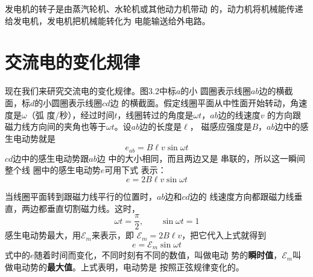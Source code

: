 发电机的转子是由蒸汽轮机、水轮机或其他动力机带动
的，动力机将机械能传递给发电机，发电机把机械能转化为
电能输送给外电路。

\section{交流电的变化规律}

\begin{figure}[htp]\centering
    \caption{}
    \end{figure}

现在我们来研究交流电的变化规律。图3.2中标$a$的小
圆圈表示线圈$ab$边的横截面，标$d$的小圆圈表示线圈$cd$边
的横截面。假定线圈平面从中性面开始转动，角速度是$\omega$（弧
度/秒），经过时间$t$，线圈转过的角度是$\omega t$，$ab$边的线速度$v$
的方向跟磁力线方向间的夹角也等于$\omega t$。设$ab$边的长度是$\ell$，
磁感应强度是$B$，$ab$边中的感
生电动势就是
\[e_{ab}=B\ell v\sin \omega t\]
$cd$边中的感生电动势跟$ab$边
中的大小相同，而且两边又是
串联的，所以这一瞬间整个线
圈中的感生电动势$e$可用下式
表示：
\[e=2B\ell v\sin \omega t\]

当线圈平面转到跟磁力线平行的位置时，$ab$边和$cd$边的
线速度方向都跟磁力线垂直，两边都垂直切割磁力线。这时，
\[\omega t=\frac{\pi}{2},\qquad \sin \omega t=1 \]
感生电动势最大，用$\mathcal{E}_m$来表示，即
$\mathcal{E}_m=2B\ell v$，把它代入上式就得到
\begin{equation}
    e=\mathcal{E}_m \sin\omega t
\end{equation}
式中的$e$随着时间而变化，不同时刻有不同的数值，叫做电动
势的\textbf{瞬时值}，$\mathcal{E}_m$叫做电动势的\textbf{最大值}。上式表明，电动势是
按照正弦规律变化的。

